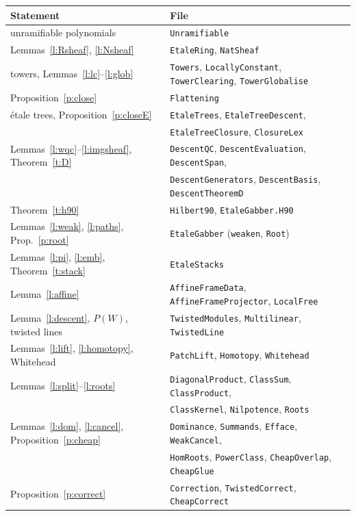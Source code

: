 \documentclass[11pt]{amsart}
\theoremstyle{definition}
\theoremstyle{remark}
\newcommand{\code}[1]{\texttt{#1}}
\begin{document}
\smallskip
\begin{center}\small
\begin{tabular}{@{}ll@{}}
Statement & File\\\hline
unramifiable polynomials & \code{Unramifiable}\\
Lemmas~\ref{l:Rsheaf}, \ref{l:Nsheaf} & \code{EtaleRing}, \code{NatSheaf}\\
towers, Lemmas~\ref{l:lc}--\ref{l:glob} & \code{Towers}, \code{LocallyConstant},
  \code{TowerClearing}, \code{TowerGlobalise}\\
Proposition~\ref{p:close} & \code{Flattening}\\
\'etale trees, Proposition~\ref{p:closeE}
  & \code{EtaleTrees}, \code{EtaleTreeDescent},\\
  & \code{EtaleTreeClosure}, \code{ClosureLex}\\
Lemmas~\ref{l:wqc}--\ref{l:imgsheaf}, Theorem~\ref{t:D}
  & \code{DescentQC}, \code{DescentEvaluation}, \code{DescentSpan},\\
  & \code{DescentGenerators}, \code{DescentBasis}, \code{DescentTheoremD}\\
Theorem~\ref{t:h90} & \code{Hilbert90}, \code{EtaleGabber.H90}\\
Lemmas~\ref{l:weak}, \ref{l:paths}, Prop.~\ref{p:root} & \code{EtaleGabber} (\code{weaken}, \code{Root})\\
Lemmas~\ref{l:pi}, \ref{l:emb}, Theorem~\ref{t:stack} & \code{EtaleStacks}\\
Lemma~\ref{l:affine} & \code{AffineFrameData}, \code{AffineFrameProjector}, \code{LocalFree}\\
Lemma~\ref{l:descent}, $P(W)$, twisted lines
  & \code{TwistedModules}, \code{Multilinear}, \code{TwistedLine}\\
Lemmas~\ref{l:lift}, \ref{l:homotopy}, Whitehead
  & \code{PatchLift}, \code{Homotopy}, \code{Whitehead}\\
Lemmas~\ref{l:split}--\ref{l:roots}
  & \code{DiagonalProduct}, \code{ClassSum}, \code{ClassProduct},\\
  & \code{ClassKernel}, \code{Nilpotence}, \code{Roots}\\
Lemmas~\ref{l:dom}, \ref{l:cancel}, Proposition~\ref{p:cheap}
  & \code{Dominance}, \code{Summands}, \code{Efface}, \code{WeakCancel},\\
  & \code{HomRoots}, \code{PowerClass}, \code{CheapOverlap}, \code{CheapGlue}\\
Proposition~\ref{p:correct} & \code{Correction}, \code{TwistedCorrect}, \code{CheapCorrect}\\

\end{tabular}
\end{center}
\end{document}
